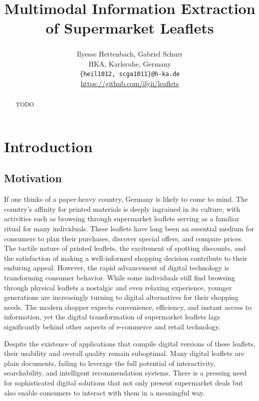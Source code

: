 \documentclass[11pt]{article}
\title{Multimodal Information Extraction of Supermarket Leaflets}
\author{Ilyesse Hettenbach\textsuperscript{}, Gabriel Schurr\textsuperscript{} \\
HKA, Karlsruhe, Germany \\
\texttt{\{heil1012, scga1011\}@h-ka.de} \\
\href{https://github.com/ilyii/leaflets}{https://github.com/ilyii/leaflets}
}
\begin{document}
\maketitle
\begin{abstract}
TODO
\end{abstract}

\section{Introduction}

\subsection{Motivation}
If one thinks of a paper-heavy country, Germany is likely to come to mind. The country's affinity for printed materials is deeply ingrained in its culture, with activities such as browsing through supermarket leaflets serving as a familiar ritual for many individuals. These leaflets have long been an essential medium for consumers to plan their purchases, discover special offers, and compare prices. The tactile nature of printed leaflets, the excitement of spotting discounts, and the satisfaction of making a well-informed shopping decision contribute to their enduring appeal.
However, the rapid advancement of digital technology is transforming consumer behavior. While some individuals still find browsing through physical leaflets a nostalgic and even relaxing experience, younger generations are increasingly turning to digital alternatives for their shopping needs. The modern shopper expects convenience, efficiency, and instant access to information, yet the digital transformation of supermarket leaflets lags significantly behind other aspects of e-commerce and retail technology.

Despite the existence of applications that compile digital versions of these leaflets, their usability and overall quality remain suboptimal. Many digital leaflets are plain documents, failing to leverage the full potential of interactivity, searchability, and intelligent recommendation systems. There is a pressing need for sophisticated digital solutions that not only present supermarket deals but also enable consumers to interact with them in a meaningful way. 
\end{document}
